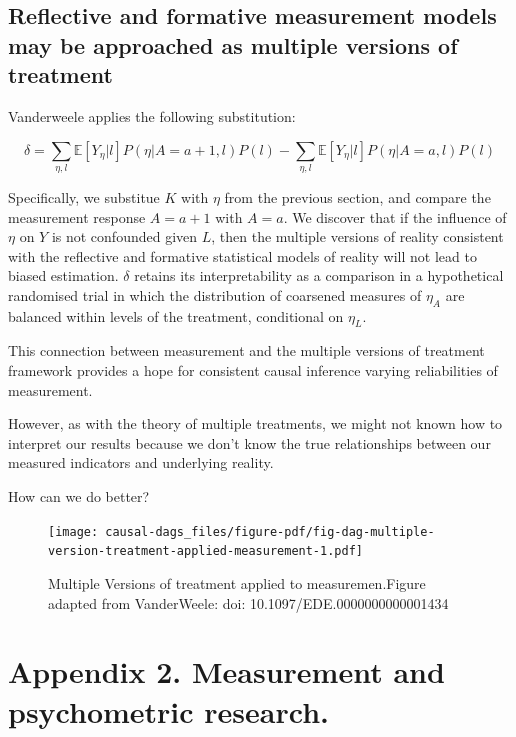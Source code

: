 \documentclass[
  singlecolumn]{report}
\begin{document}
\hypertarget{reflective-and-formative-measurement-models-may-be-approached-as-multiple-versions-of-treatment}{%
\subsection{Reflective and formative measurement models may be
approached as multiple versions of
treatment}\label{reflective-and-formative-measurement-models-may-be-approached-as-multiple-versions-of-treatment}}

Vanderweele applies the following substitution:

\[\delta = \sum_{\eta,l} \mathbb{E}[Y_\eta|l] P(\eta|A=a+1,l) P(l) - \sum_{\eta,l} \mathbb{E}[Y_\eta|l] P(\eta|A=a,l) P(l)\]

Specifically, we substitue \(K\) with \(\eta\) from the previous
section, and compare the measurement response \(A = a + 1\) with
\(A = a\). We discover that if the influence of \(\eta\) on \(Y\) is not
confounded given \(L\), then the multiple versions of reality consistent
with the reflective and formative statistical models of reality will not
lead to biased estimation. \(\delta\) retains its interpretability as a
comparison in a hypothetical randomised trial in which the distribution
of coarsened measures of \(\eta_A\) are balanced within levels of the
treatment, conditional on \(\eta_L\).

This connection between measurement and the multiple versions of
treatment framework provides a hope for consistent causal inference
varying reliabilities of measurement.

However, as with the theory of multiple treatments, we might not known
how to interpret our results because we don't know the true
relationships between our measured indicators and underlying reality.

How can we do better?

\begin{figure}

{\centering \texttt{[image: causal-dags\_files/figure-pdf/fig-dag-multiple-version-treatment-applied-measurement-1.pdf]}

}

\caption{\label{fig-dag-multiple-version-treatment-applied-measurement}Multiple
Versions of treatment applied to measuremen.Figure adapted from
VanderWeele: doi: 10.1097/EDE.0000000000001434}

\end{figure}

\hypertarget{appendix-2.-measurement-and-psychometric-research.}{%
\section{Appendix 2. Measurement and psychometric
research.}\label{appendix-2.-measurement-and-psychometric-research.}}
\end{document}
